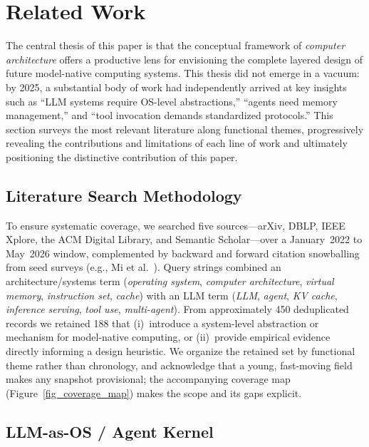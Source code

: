 \section{Related Work}
\label{sec:related}

The central thesis of this paper is that the conceptual framework of \textit{computer architecture} offers a productive lens for envisioning the complete layered design of future model-native computing systems.
This thesis did not emerge in a vacuum: by 2025, a substantial body of work had independently arrived at key insights such as ``LLM systems require OS-level abstractions,'' ``agents need memory management,'' and ``tool invocation demands standardized protocols.''
This section surveys the most relevant literature along functional themes, progressively revealing the contributions and limitations of each line of work and ultimately positioning the distinctive contribution of this paper.

\subsection{Literature Search Methodology}
\label{sec:related-method}
To ensure systematic coverage, we searched five sources---arXiv, DBLP, IEEE Xplore, the ACM Digital Library, and Semantic Scholar---over a January~2022 to May~2026 window, complemented by backward and forward citation snowballing from seed surveys (e.g., Mi et al.~\cite{mi2025llmagentscomputersystems}). Query strings combined an architecture/systems term (\emph{operating system}, \emph{computer architecture}, \emph{virtual memory}, \emph{instruction set}, \emph{cache}) with an LLM term (\emph{LLM}, \emph{agent}, \emph{KV cache}, \emph{inference serving}, \emph{tool use}, \emph{multi-agent}). From approximately 450 deduplicated records we retained 188 that (i)~introduce a system-level abstraction or mechanism for model-native computing, or (ii)~provide empirical evidence directly informing a design heuristic. We organize the retained set by functional theme rather than chronology, and acknowledge that a young, fast-moving field makes any snapshot provisional; the accompanying coverage map (Figure~\ref{fig_coverage_map}) makes the scope and its gaps explicit.

\subsection{LLM-as-OS / Agent Kernel}
\label{sec:related-llmos}

